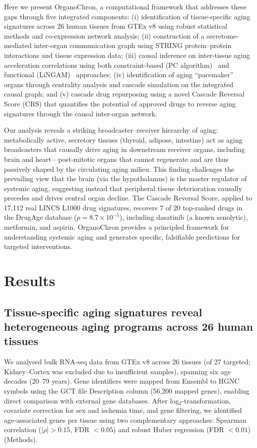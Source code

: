 \documentclass[11pt,a4paper]{article}
\begin{document}
Here we present OrganoChron, a computational framework that addresses these gaps through five integrated components: (i) identification of tissue-specific aging signatures across 26 human tissues from GTEx v8 using robust statistical methods and co-expression network analysis; (ii) construction of a secretome-mediated inter-organ communication graph using STRING protein--protein interactions and tissue expression data; (iii) causal inference on inter-tissue aging acceleration correlations using both constraint-based (PC algorithm)~\cite{ref20} and functional (LiNGAM)~\cite{ref21} approaches; (iv) identification of aging ``pacemaker'' organs through centrality analysis and cascade simulation on the integrated causal graph; and (v) cascade drug repurposing using a novel Cascade Reversal Score (CRS) that quantifies the potential of approved drugs to reverse aging signatures through the causal inter-organ network.

Our analysis reveals a striking broadcaster--receiver hierarchy of aging: metabolically active, secretory tissues (thyroid, adipose, intestine) act as aging broadcasters that causally drive aging in downstream receiver organs, including brain and heart---post-mitotic organs that cannot regenerate and are thus passively shaped by the circulating aging milieu. This finding challenges the prevailing view that the brain (via the hypothalamus) is the master regulator of systemic aging, suggesting instead that peripheral tissue deterioration causally precedes and drives central organ decline. The Cascade Reversal Score, applied to 17,112 real LINCS L1000 drug signatures, recovers 7 of 20 top-ranked drugs in the DrugAge database ($p = 8.7 \times 10^{-5}$), including dasatinib (a known senolytic), metformin, and aspirin. OrganoChron provides a principled framework for understanding systemic aging and generates specific, falsifiable predictions for targeted interventions.

\section*{Results}

\subsection*{Tissue-specific aging signatures reveal heterogeneous aging programs across 26 human tissues}

We analysed bulk RNA-seq data from GTEx v8 across 26 tissues (of 27 targeted; Kidney--Cortex was excluded due to insufficient samples), spanning six age decades (20--79 years). Gene identifiers were mapped from Ensembl to HGNC symbols using the GCT file Description column (56,200 mapped genes), enabling direct comparison with external gene databases. After log$_2$-transformation, covariate correction for sex and ischemia time, and gene filtering, we identified age-associated genes per tissue using two complementary approaches: Spearman correlation ($|\rho| > 0.15$, FDR $< 0.05$) and robust Huber regression (FDR $< 0.01$) (Methods).
\end{document}
